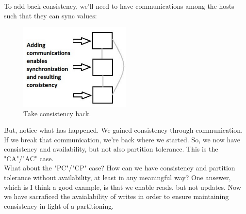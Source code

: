 To add back consistency, we'll need to have communications among the hosts such that they can sync values:
\begin{figure}
\centering
\includegraphics[width=0.5\textwidth]{img/ch07-consist.png}
\caption{Take consistency back.}
\label{fig:ch07-consist}
\end{figure}
But, notice what has happened. We gained consistency through communication. If we break that communication, we're back where we started. So, we now have consistency and availability, but not also partition tolerance. This is the "CA"/"AC" case.
\\

What about the "PC"/"CP" case? How can we have consistency and partition tolerance without availability, at least in any meaningful way? One ansewer, which is I think a good example, is that we enable reads, but not updates. Now we have sacraficed the avaialability of writes in order to ensure maintaining consistency in light of a partitioning.

